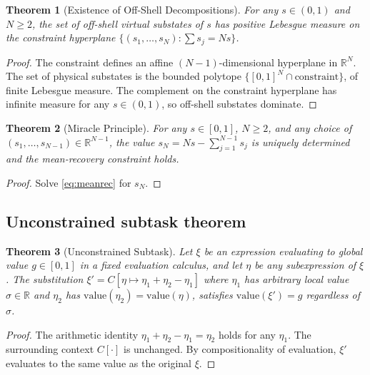 \documentclass[twocolumn,10pt,a4paper]{article}
\theoremstyle{thmstyle}
\newtheorem{theorem}{Theorem}[section]
\theoremstyle{definition}
\theoremstyle{remark}
\newcommand{\R}{\mathbb{R}}
\begin{document}
\begin{theorem}[Existence of Off-Shell Decompositions]
\label{thm:exoff}
For any $s\in(0,1)$ and $N\geq 2$, the set of off-shell virtual
substates of $s$ has positive Lebesgue measure on the constraint
hyperplane $\{(s_{1},\ldots,s_{N}):\sum s_{j}=Ns\}$.
\end{theorem}

\begin{proof}
The constraint defines an affine $(N-1)$-dimensional hyperplane in
$\R^{N}$. The set of physical substates is the bounded polytope
$\{[0,1]^{N}\cap\text{constraint}\}$, of finite Lebesgue measure. The
complement on the constraint hyperplane has infinite measure for any
$s\in(0,1)$, so off-shell substates dominate.
\end{proof}

\begin{theorem}[Miracle Principle]
\label{thm:mir}
For any $s\in[0,1]$, $N\geq 2$, and any choice of
$(s_{1},\ldots,s_{N-1})\in\R^{N-1}$, the value
$s_{N}=Ns-\sum_{j=1}^{N-1}s_{j}$ is uniquely determined and the
mean-recovery constraint holds.
\end{theorem}

\begin{proof}
Solve \eqref{eq:meanrec} for $s_{N}$.
\end{proof}

\subsection{Unconstrained subtask theorem}

\begin{theorem}[Unconstrained Subtask]
\label{thm:unsub}
Let $\xi$ be an expression evaluating to global value $g\in[0,1]$ in
a fixed evaluation calculus, and let $\eta$ be any subexpression of
$\xi$. The substitution
$\xi'=C[\eta\mapsto\eta_{1}+\eta_{2}-\eta_{1}]$ where $\eta_{1}$ has
arbitrary local value $\sigma\in\R$ and $\eta_{2}$ has
$\mathrm{value}(\eta_{2})=\mathrm{value}(\eta)$, satisfies
$\mathrm{value}(\xi')=g$ regardless of $\sigma$.
\end{theorem}

\begin{proof}
The arithmetic identity $\eta_{1}+\eta_{2}-\eta_{1}=\eta_{2}$ holds
for any $\eta_{1}$. The surrounding context $C[\cdot]$ is
unchanged. By compositionality of evaluation, $\xi'$ evaluates to the
same value as the original $\xi$.
\end{proof}
\end{document}
